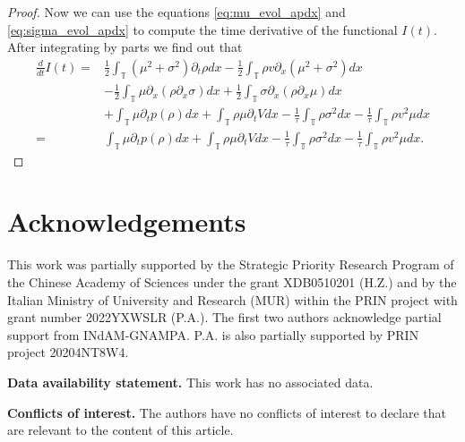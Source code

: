 \documentclass[leqno]{amsart}
\theoremstyle{plain}
\theoremstyle{definition}
\theoremstyle{remark}
\theoremstyle{plain}
\theoremstyle{plain}
\def\T{{\mathbb T}}%
\def\d{{\partial}}
\numberwithin{equation}{section}
\begin{document}
\begin{proof}
Now we can use the equations \eqref{eq:mu_evol_apdx} and \eqref{eq:sigma_evol_apdx} to compute the time derivative of the functional $I (t)$. After integrating by parts we find out that
\begin{align*}
\frac{d}{dt}I (t)=&\frac{1}{2}\int_\T (\mu ^2+\sigma ^2)\d_t\rho  dx-\frac{1}{2}\int_\T \rho  v \d_x(\mu ^2+\sigma ^2)dx\\
&-\frac{1}{2}\int_\T \mu \d_x(\rho\d_x\sigma )dx+\frac{1}{2}\int_\T\sigma \d_x(\rho \d_x\mu )dx\\
&+\int_\T \mu \d_tp(\rho )dx+\int_\T \rho \mu \d_tV  dx-\frac{1}{\tau}\int_\T \rho \sigma ^2dx-\frac{1}{\tau}\int_\T\rho  v ^2\mu  dx\\
=&\int_\T \mu \d_tp(\rho )dx+\int_\T \rho \mu \d_tV  dx-\frac{1}{\tau}\int_\T \rho \sigma ^2dx-\frac{1}{\tau}\int_\T\rho  v ^2\mu dx.
\end{align*}
\end{proof}

\section*{Acknowledgements}
This work was partially supported by the Strategic Priority Research Program of the Chinese Academy of Sciences under the grant XDB0510201 (H.Z.) and by the Italian Ministry of University and Research (MUR) 
within the PRIN project with grant number 2022YXWSLR (P.A.).
The first two authors acknowledge partial support from INdAM-GNAMPA. P.A. is also partially supported by PRIN project 20204NT8W4.

\bigskip
		
		\noindent\textbf{Data availability statement.} This work has no associated data.
		
		\medskip
		
		\noindent\textbf{Conflicts of interest.} The authors have no conflicts of interest to declare that are relevant to the content of this article.
		
\end{document}
